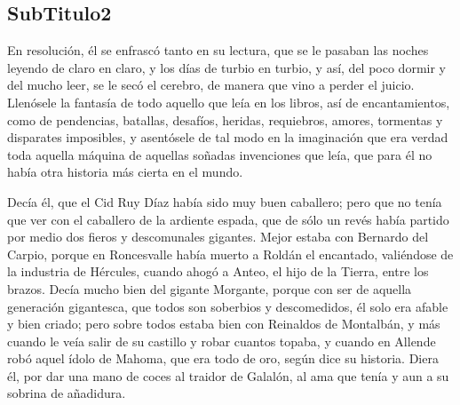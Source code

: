 \subsection{SubTitulo2}
 En resolución, él se enfrascó tanto en su lectura, que se le pasaban las noches leyendo de claro en claro, y los días de turbio en turbio, y así, del poco dormir y del mucho leer, se le secó el cerebro, de manera que vino a perder el juicio. Llenósele la fantasía de todo aquello que leía en los libros, así de encantamientos, como de pendencias, batallas, desafíos, heridas, requiebros, amores, tormentas y disparates imposibles, y asentósele de tal modo en la imaginación que era verdad toda aquella máquina de aquellas soñadas invenciones que leía, que para él no había otra historia más cierta en el mundo.

Decía él, que el Cid Ruy Díaz había sido muy buen caballero; pero que no tenía que ver con el caballero de la ardiente espada, que de sólo un revés había partido por medio dos fieros y descomunales gigantes. Mejor estaba con Bernardo del Carpio, porque en Roncesvalle había muerto a Roldán el encantado, valiéndose de la industria de Hércules, cuando ahogó a Anteo, el hijo de la Tierra, entre los brazos. Decía mucho bien del gigante Morgante, porque con ser de aquella generación gigantesca, que todos son soberbios y descomedidos, él solo era afable y bien criado; pero sobre todos estaba bien con Reinaldos de Montalbán, y más cuando le veía salir de su castillo y robar cuantos topaba, y cuando en Allende robó aquel ídolo de Mahoma, que era todo de oro, según dice su historia. Diera él, por dar una mano de coces al traidor de Galalón, al ama que tenía y aun a su sobrina de añadidura.

%
%

%

%
